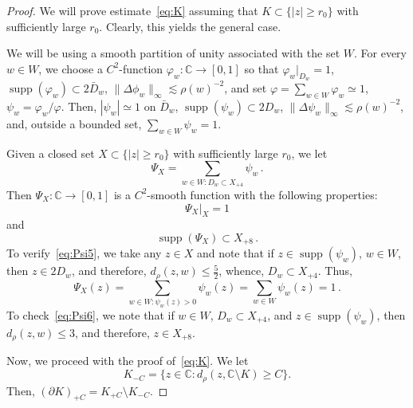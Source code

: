 \documentclass[11pt]{amsart}
\numberwithin{equation}{section}
\newcommand{\bC}{\mathbb C}
\begin{document}
\begin{proof}
We will prove estimate~\eqref{eq:K} assuming that $K\subset \{|z|\ge r_0\}$
with sufficiently large $r_0$. Clearly, this yields the general case.

We will be using a smooth partition of unity associated with
the set $W$. For every $w\in W$, we choose a $C^2$-function $\varphi_w\colon \bC\to [0, 1]$ so that
$\varphi_w\bigl|_{D_w} = 1$, $\operatorname{supp}(\varphi_w) \subset 2\bar D_w$, $\|\Delta \phi_w \|_\infty\lesssim \rho(w)^{-2}$, and set
$ \varphi = \sum_{w\in W} \varphi_w \simeq 1 $,
$\psi_w = \varphi_w/\varphi$. Then,
$|\psi_w| \simeq 1  $ on $\bar D_w$, $\operatorname{supp}(\psi_w) \subset 2D_w$,
$ \| \Delta \psi_w \|_\infty \lesssim  \rho(w)^{-2}$, and, outside a bounded set,
$ \sum_{w\in W} \psi_w = 1 $.

Given a closed set $X\subset \{|z|\ge r_0\}$ with sufficiently large $r_0$, we let
\[
\Psi_X = \sum_{w\in W\colon D_w\subset X_{+4}} \psi_w\,.
\]
Then $\Psi_X\colon\bC\to [0, 1]$ is a $C^2$-smooth function with the following properties:
\begin{equation}\label{eq:Psi5}
\Psi_X \bigl|_{X} = 1
\end{equation}
and
\begin{equation}\label{eq:Psi6}
\operatorname{supp}(\Psi_X) \subset X_{+8}\,.
\end{equation}
To verify~\eqref{eq:Psi5}, we take any $z\in X$ and note that if $z\in\operatorname{supp}(\psi_w)$,
$w\in W$, then $z\in 2D_w$, and therefore, $d_\rho(z, w) \le \tfrac52$, whence, $D_w\subset X_{+4}$.
Thus,
\[
\Psi_X(z) = \sum_{w\in W\colon \psi_w(z)>0} \psi_w(z) = \sum_{w\in W} \psi_w(z) = 1\,.
\]
To check~\eqref{eq:Psi6}, we note that if $w\in W$, $D_w\subset X_{+4}$, and $z\in \operatorname{supp}(\psi_w)$,
then $d_\rho(z, w)\le 3$, and therefore, $z\in X_{+8}$.

Now, we proceed with the proof of~\eqref{eq:K}.
We let \[K_{-C} = \{z\in\bC\colon d_\rho(z, \bC\setminus K)\ge C\}.\]
Then, $(\partial K)_{+C} = K_{+C}\setminus K_{-C}$.


\end{proof}
\end{document}
